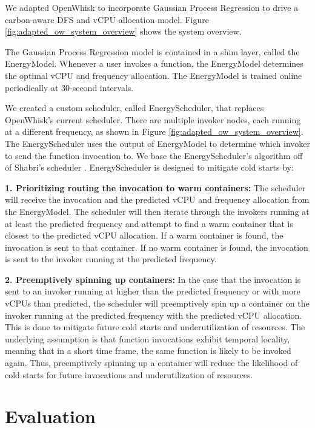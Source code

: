 \documentclass[times, 10pt,twocolumn]{article}
\begin{document}
We adapted OpenWhisk to incorporate Gaussian Process Regression to drive a carbon-aware DFS and vCPU allocation model. Figure \ref{fig:adapted_ow_system_overview} shows the system overview.

The Gaussian Process Regression model is contained in a shim layer, called the EnergyModel. Whenever a user invokes a function, the EnergyModel determines the optimal vCPU and frequency allocation. The EnergyModel is trained online periodically at 30-second intervals.

We created a custom scheduler, called EnergyScheduler, that replaces OpenWhisk's current scheduler. There are multiple invoker nodes, each running at a different frequency, as shown in Figure \ref{fig:adapted_ow_system_overview}. The EnergyScheduler uses the output of EnergyModel to determine which invoker to send the function invocation to. We base the EnergyScheduler's algorithm off of Shabri's scheduler \cite{sinha2024shabari}. EnergyScheduler is designed to mitigate cold starts by:

\textbf{1. Prioritizing routing the invocation to warm containers: } The scheduler will receive the invocation and the predicted vCPU and frequency allocation from the EnergyModel. The scheduler will then iterate through the invokers running at at least the predicted frequency and attempt to find a warm container that is closest to the predicted vCPU allocation. If a warm container is found, the invocation is sent to that container. If no warm container is found, the invocation is sent to the invoker running at the predicted frequency.

\textbf{2. Preemptively spinning up containers: } In the case that the invocation is sent to an invoker running at higher than the predicted frequency or with more vCPUs than predicted, the scheduler will preemptively spin up a container on the invoker running at the predicted frequency with the predicted vCPU allocation. This is done to mitigate future cold starts and underutilization of resources. The underlying assumption is that function invocations exhibit temporal locality, meaning that in a short time frame, the same function is likely to be invoked again. Thus, preemptively spinning up a container will reduce the likelihood of cold starts for future invocations and underutilization of resources.

\section{Evaluation}
\end{document}
